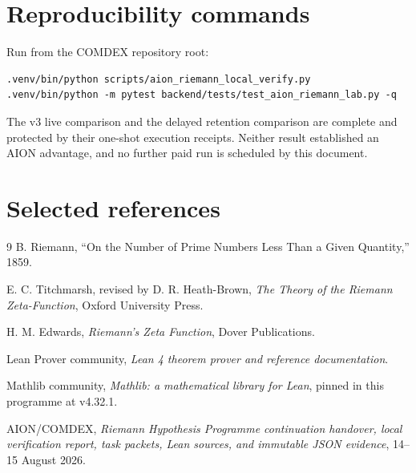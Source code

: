 \documentclass[11pt,a4paper]{article}
\begin{document}
\section{Reproducibility commands}

Run from the COMDEX repository root:

\begin{lstlisting}[language={}]
.venv/bin/python scripts/aion_riemann_local_verify.py
.venv/bin/python -m pytest backend/tests/test_aion_riemann_lab.py -q
\end{lstlisting}

The v3 live comparison and the delayed retention comparison are complete and
protected by their one-shot execution receipts. Neither result established an
AION advantage, and no further paid run is scheduled by this document.

\section{Selected references}

\begin{thebibliography}{9}
B. Riemann, ``On the Number of Prime Numbers Less Than a Given Quantity,'' 1859.

E. C. Titchmarsh, revised by D. R. Heath-Brown, \emph{The Theory of the Riemann Zeta-Function}, Oxford University Press.

H. M. Edwards, \emph{Riemann's Zeta Function}, Dover Publications.

Lean Prover community, \emph{Lean 4 theorem prover and reference documentation}.

Mathlib community, \emph{Mathlib: a mathematical library for Lean}, pinned in this programme at v4.32.1.

AION/COMDEX, \emph{Riemann Hypothesis Programme continuation handover, local verification report, task packets, Lean sources, and immutable JSON evidence}, 14--15 August 2026.
\end{thebibliography}
\end{document}
